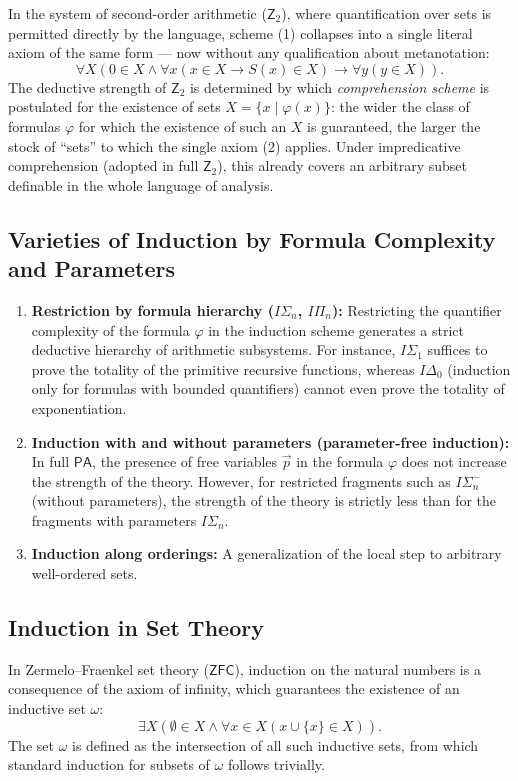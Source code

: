 \documentclass[12pt,a4paper]{article}
\theoremstyle{plain}
\theoremstyle{definition}
\newcommand{\ph}{\varphi}
\newcommand{\toinf}{\rightarrow}
\newcommand{\PA}{\textsf{PA}}
\newcommand{\Ztwo}{\textsf{Z}_2}
\newcommand{\ZFC}{\textsf{ZFC}}
\begin{document}
In the system of second-order arithmetic ($\Ztwo$), where quantification over sets is permitted directly by the language, scheme (1) collapses into a single literal axiom of the same form --- now without any qualification about metanotation:
\begin{equation}
    \forall X \left( 0 \in X \land \forall x (x \in X \toinf S(x) \in X) \toinf \forall y (y \in X) \right).
\end{equation}
The deductive strength of $\Ztwo$ is determined by which \textit{comprehension scheme} is postulated for the existence of sets $X = \{x \mid \ph(x)\}$: the wider the class of formulas $\ph$ for which the existence of such an $X$ is guaranteed, the larger the stock of ``sets'' to which the single axiom (2) applies. Under impredicative comprehension (adopted in full $\Ztwo$), this already covers an arbitrary subset definable in the whole language of analysis.

\subsection{Varieties of Induction by Formula Complexity and Parameters}
\begin{enumerate}[label=\arabic*.]
    \item \textbf{Restriction by formula hierarchy ($I\Sigma_n$, $I\Pi_n$):} Restricting the quantifier complexity of the formula $\ph$ in the induction scheme generates a strict deductive hierarchy of arithmetic subsystems. For instance, $I\Sigma_1$ suffices to prove the totality of the primitive recursive functions, whereas $I\Delta_0$ (induction only for formulas with bounded quantifiers) cannot even prove the totality of exponentiation.
    \item \textbf{Induction with and without parameters (parameter-free induction):} In full $\PA$, the presence of free variables $\vec{p}$ in the formula $\ph$ does not increase the strength of the theory. However, for restricted fragments such as $I\Sigma_n^-$ (without parameters), the strength of the theory is strictly less than for the fragments with parameters $I\Sigma_n$.
    \item \textbf{Induction along orderings:} A generalization of the local step to arbitrary well-ordered sets.
\end{enumerate}

\subsection{Induction in Set Theory}
In Zermelo--Fraenkel set theory ($\ZFC$), induction on the natural numbers is a consequence of the axiom of infinity, which guarantees the existence of an inductive set $\omega$:
\begin{equation}
    \exists X \left( \emptyset \in X \land \forall x \in X (x \cup \{x\} \in X) \right).
\end{equation}
The set $\omega$ is defined as the intersection of all such inductive sets, from which standard induction for subsets of $\omega$ follows trivially.
\end{document}
